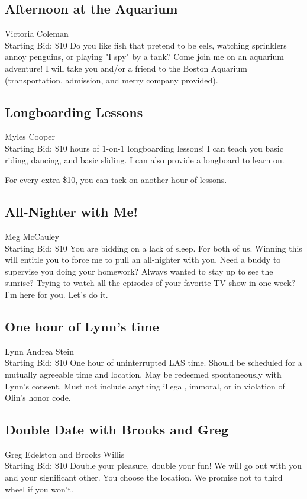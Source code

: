 \documentclass[11pt]{article}
\begin{document}
\subsection{Afternoon at the Aquarium}
Victoria Coleman
\\
Starting Bid: \$10
\newline
Do you like fish that pretend to be eels, watching sprinklers annoy penguins, or playing "I spy" by a tank? Come join me on an aquarium adventure! I will take you and/or a friend to the Boston Aquarium (transportation, admission, and merry company provided).
\subsection{Longboarding Lessons}
Myles Cooper
\\
Starting Bid: \$10
 hours of 1-on-1 longboarding lessons! I can teach you basic riding, dancing, and basic sliding. I can also provide a longboard to learn on.

For every extra \$10, you can tack on another hour of lessons.
\subsection{All-Nighter with Me!}
Meg McCauley
\\
Starting Bid: \$10
\newline
You are bidding on a lack of sleep. For both of us. Winning this will entitle you to force me to pull an all-nighter with you. Need a buddy to supervise you doing your homework? Always wanted to stay up to see the sunrise? Trying to watch all the episodes of your favorite TV show in one week? I'm here for you. Let's do it.
\subsection{One hour of Lynn's time}
Lynn Andrea Stein
\\
Starting Bid: \$10
\newline
One hour of uninterrupted LAS time.  Should be scheduled for a mutually agreeable time and location.  May be redeemed spontaneously with Lynn's consent.  Must not include anything illegal, immoral, or in violation of Olin's honor code.
\subsection{Double Date with Brooks and Greg}
Greg Edelston and Brooks Willis
\\
Starting Bid: \$10
\newline
Double your pleasure, double your fun! We will go out with you and your significant other. You choose the location. We promise not to third wheel if you won't.
\end{document}
